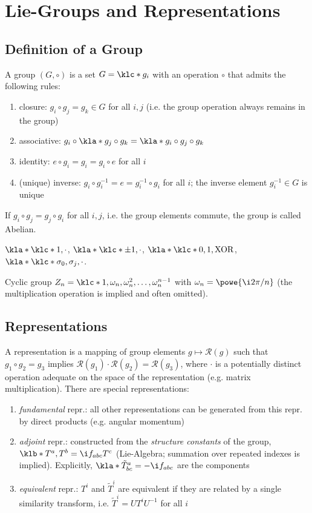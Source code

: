 \documentclass[english, parskip=full]{scrbook}
\title{\Title}
\author{\Author}
\date{\today}
\newcommand{\example}[3]{\begin{tcolorbox}[colback=colorbackgroundexample,colframe=colorexample, breakable,enhanced,title={\textbf{#1}: #2.}]#3\end{tcolorbox}}
\begin{document}
\maketitle  %
\tableofcontents  %

\chapter{Lie-Groups and Representations}
\section{Definition of a Group}
A group $(G,\circ)$ is a set $G=\klc*{g_i}$ with an operation $\circ$ that admits the following rules:
\begin{enumerate}
\item closure: $g_i\circ g_j=g_k\in G$ for all $i,j$ (i.e. the group operation always remains in the group)
\item associative: $g_i\circ \kla*{g_j\circ g_k} = \kla*{g_i\circ g_j}\circ g_k$
\item identity: $e\circ g_i=g_i=g_i\circ e$ for all $i$
\item (unique) inverse: $g_i\circ g_i^{-1}=e=g_i^{-1}\circ g_i$ for all $i$; the inverse element $g_i^{-1}\in G$ is unique
\end{enumerate}
If $g_i\circ g_j=g_j\circ g_i$ for all $i,j$, i.e. the group elements commute, the group is called Abelian.
\example{Some Groups}{}{
$\kla*{\klc*{1},\cdot}$, $\kla*{\klc*{\pm 1}, \cdot}$, $\kla*{\klc*{0,1},\text{XOR}}$, $\kla*{\klc*{\sigma_0,\sigma_j},\cdot}$.

Cyclic group $Z_n=\klc*{1,\omega_n,\omega_n^2,\dots,\omega_n^{n-1}}$ with $\omega_n = \powe{\i 2\pi/n}$ (the multiplication operation is implied and often omitted).
}
\section{Representations}
A representation is a mapping of group elements $g\mapsto \mathcal{R}(g)$ such that $g_1\circ g_2 = g_3$ implies $\mathcal{R}(g_1) \cdot \mathcal{R}(g_2) = \mathcal{R}(g_3)$, where $\cdot$ is a potentially distinct operation adequate on the space of the representation (e.g. matrix multiplication).
There are special representations:
\begin{enumerate}
\item \emph{fundamental} repr.: all other representations can be generated from this repr. by direct products (e.g. angular momentum)
\item \emph{adjoint} repr.: constructed from the \emph{structure constants} of the group, $\klb*{T^a,T^b} = \i f_{abc} T^c$ (Lie-Algebra; summation over repeated indexes is implied). Explicitly, $\kla*{\tilde{T}^a}_{bc} = -\i f_{abc}$ are the components
\item \emph{equivalent} repr.: $T^i$ and $\tilde{T}^i$ are equivalent if they are related by a single similarity transform, i.e. $\tilde{T}^i = UT^i U^{-1}$ for all $i$
\end{enumerate}
\end{document}
